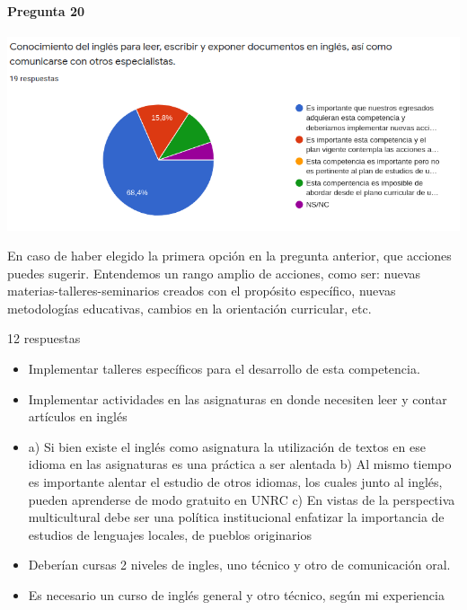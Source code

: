 \documentclass[a4paper,10pt,BCOR10mm,oneside,headsepline]{scrbook}
\begin{document}
\begin{subappendices}
 
     \paragraph{Pregunta 20}
\begin{center}
 
\includegraphics[scale=.9]{doc20.png}
 \end{center}
 
 En caso de haber elegido la primera opción en la pregunta anterior, que acciones puedes sugerir. Entendemos un rango amplio de acciones, como ser: nuevas materias-talleres-seminarios creados con el propósito específico, nuevas metodologías educativas, cambios en la orientación curricular, etc. 
 
 12 respuestas

 
 \begin{itemize}

 \item Implementar talleres específicos para el desarrollo de esta competencia. 
 
\item Implementar actividades en las asignaturas en donde necesiten leer y contar artículos en inglés 

\item a) Si bien existe el inglés como asignatura la utilización de textos en ese idioma en las asignaturas es una práctica a ser alentada b) Al mismo tiempo es importante alentar el estudio de otros idiomas, los cuales junto al inglés, pueden aprenderse de modo gratuito en UNRC c) En vistas de la perspectiva multicultural debe ser una política institucional enfatizar la importancia de estudios de lenguajes locales, de pueblos originarios

\item Deberían cursas 2 niveles de ingles, uno técnico y otro de comunicación oral.

\item Es necesario un curso de inglés general y otro técnico, según mi experiencia


\end{itemize}
\end{subappendices}
\end{document}
